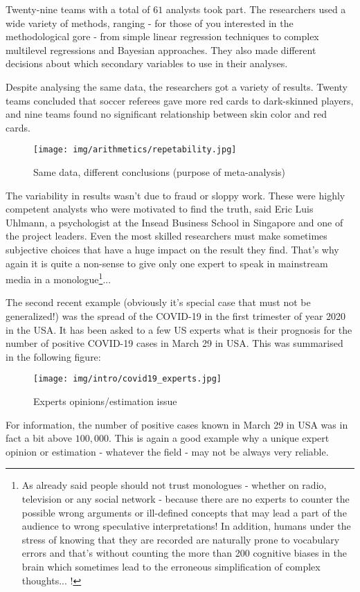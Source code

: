 	Twenty-nine teams with a total of $61$ analysts took part. The researchers used a wide variety of methods, ranging - for those of you interested in the methodological gore - from simple linear regression techniques to complex multilevel regressions and Bayesian approaches. They also made different decisions about which secondary variables to use in their analyses.

	Despite analysing the same data, the researchers got a variety of results. Twenty teams concluded that soccer referees gave more red cards to dark-skinned players, and nine teams found no significant relationship between skin color and red cards.
	\begin{figure}[H]
		\centering
		\texttt{[image: img/arithmetics/repetability.jpg]}
		\caption{Same data, different conclusions (purpose of meta-analysis)}
	\end{figure}
	The variability in results wasn't due to fraud or sloppy work. These were highly competent analysts who were motivated to find the truth, said Eric Luis Uhlmann, a psychologist at the Insead Business School in Singapore and one of the project leaders. Even the most skilled researchers must make sometimes subjective choices that have a huge impact on the result they find. That's why again it is quite a non-sense to give only one expert to speak in mainstream media in a monologue\footnote{As already said people should not trust monologues - whether on radio, television or any social network - because there are no experts to counter the possible wrong arguments or ill-defined concepts that may lead a part of the audience to wrong speculative interpretations! In addition, humans under the stress of knowing that they are recorded are naturally prone to vocabulary errors and that's without counting the more than 200 cognitive biases in the brain which sometimes lead to the erroneous simplification of complex thoughts... !}...
	
	The second recent example (obviously it's special case that must not be generalized!) was the spread of the COVID-19 in the first trimester of year 2020 in the USA. It has been asked to a few US experts what is their prognosis for the number of positive COVID-19 cases in March 29 in USA. This was summarised in the following figure:
	\begin{figure}[H]
		\centering
		\texttt{[image: img/intro/covid19\_experts.jpg]}
		\caption{Experts opinions/estimation issue}
	\end{figure}
	For information, the number of positive cases known in March 29 in USA was in fact a bit above $100,000$. This is again a good example why a unique expert opinion or estimation - whatever the field - may not be always very reliable.
	
